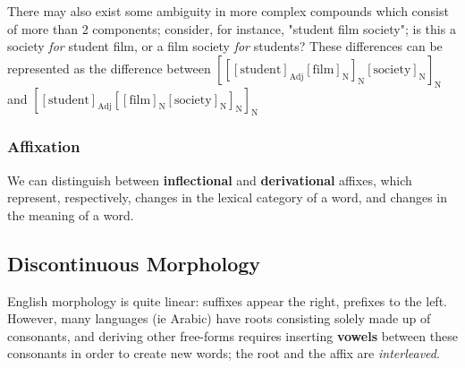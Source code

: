 \documentclass[12pt]{article}
\begin{document}
There may also exist some ambiguity in more complex compounds which consist of more than 2 components; consider, for instance, "student film society"; is this a society \textit{for} student film, or a film society \textit{for} students? These differences can be represented as the difference between \([[[\text{student}]_{\text{Adj}}[\text{film}]_{\text{N}}]_{\text{N}}[\text{society}]_{\text{N}}]_{\text{N}}\) and \([[\text{student}]_{\text{Adj}}[[\text{film}]_{\text{N}}[\text{society}]_{\text{N}}]_{\text{N}}]_{\text{N}}\)

\begin{center} 
  \end{center}

\begin{center} 
  \end{center}


\subsubsection{Affixation}

We can distinguish between \textbf{inflectional} and \textbf{derivational} affixes, which represent, respectively, changes in the lexical category of a word, and changes in the meaning of a word.

\subsection{Discontinuous Morphology}

English morphology is quite linear: suffixes appear the right, prefixes to the left. However, many languages (ie Arabic) have roots consisting solely made up of consonants, and deriving other free-forms requires inserting \textbf{vowels} between these consonants in order to create new words; the root and the affix are \textit{interleaved}.
\end{document}
